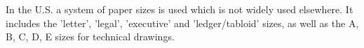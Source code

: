 In the U.S. a system of paper sizes is used which is not widely used elsewhere.
It includes the 'letter', 'legal', 'executive' and 'ledger/tabloid' sizes,
as well as the A, B, C, D, E sizes for technical drawings.